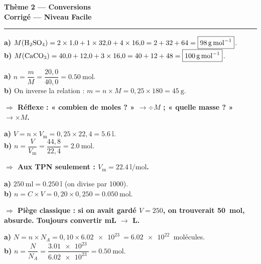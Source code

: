 \documentclass[11pt,a4paper]{article}
\newcommand{\Vm}{V_{\mathrm m}}
\newcommand{\rep}[1]{\par\smallskip\noindent\textbf{\color{corrcol}$\Rightarrow$ #1}}
\begin{document}
\begin{center}
{\LARGE\bfseries\color{primarydark}Thème 2 — Conversions}\\[1pt]
{\large\color{corrcol}\textbf{Corrigé — Niveau Facile}}\\
{\color{primary}\rule{0.6\linewidth}{1pt}}
\end{center}

\begin{cor}
\textbf{a)} $M(\ce{H2SO4}) = 2\times1{,}0 + 1\times32{,}0 + 4\times16{,}0 = 2+32+64 = \boxed{\SI{98}{\gram\per\mole}}$.\\
\textbf{b)} $M(\ce{CaCO3}) = 40{,}0 + 12{,}0 + 3\times16{,}0 = 40+12+48 = \boxed{\SI{100}{\gram\per\mole}}$.
\end{cor}

\begin{cor}
\textbf{a)} $n=\dfrac{m}{M}=\dfrac{20{,}0}{40{,}0}=\boxed{\SI{0,50}{\mole}}$.\\
\textbf{b)} On inverse la relation : $m=n\times M = 0{,}25\times180 = \boxed{\SI{45}{\gram}}$.
\rep{Réflexe : « combien de moles ? » $\to \div M$ ; « quelle masse ? » $\to \times M$.}
\end{cor}

\begin{cor}
\textbf{a)} $V = n\times\Vm = 0{,}25\times22{,}4 = \boxed{\SI{5,6}{\litre}}$.\\
\textbf{b)} $n = \dfrac{V}{\Vm} = \dfrac{44{,}8}{22{,}4} = \boxed{\SI{2,0}{\mole}}$.
\rep{Aux TPN seulement : $\Vm=\SI{22,4}{\litre\per\mole}$.}
\end{cor}

\begin{cor}
\textbf{a)} $\SI{250}{\milli\litre} = \SI{0,250}{\litre}$ (on divise par 1000).\\
\textbf{b)} $n = C\times V = 0{,}20\times0{,}250 = \boxed{\SI{0,050}{\mole}}$.
\rep{Piège classique : si on avait gardé $V=250$, on trouverait \SI{50}{\mole}, absurde. Toujours convertir mL $\to$ L.}
\end{cor}

\begin{cor}
\textbf{a)} $N = n\times N_A = 0{,}10\times\SI{6,02e23}{} = \boxed{\SI{6,02e22}{}}$ molécules.\\
\textbf{b)} $n = \dfrac{N}{N_A} = \dfrac{\SI{3,01e23}{}}{\SI{6,02e23}{}} = \boxed{\SI{0,50}{\mole}}$.
\end{cor}
\end{document}
